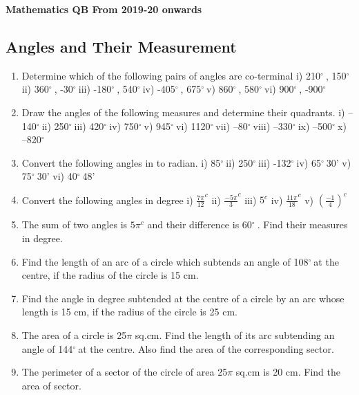 \documentclass[14pt]{article}
\newcommand{\degree}{$^{\circ}\ $} %
\begin{document}
\centering 
{\huge \bf Mathematics QB From 2019-20 onwards\par}
\vspace{1cm}
\begin{multicols}{2}
\section{Angles and Their Measurement}
\noindent
\begin{enumerate}
  
\item Determine which of the following pairs
of angles are co-terminal i) 210\degree, 150\degree
ii) 360\degree, -30\degree iii) -180\degree, 540\degree iv) -405\degree, 675\degree v) 860\degree, 580\degree vi) 900\degree, -900\degree 
\item Draw the angles of the following measures
and determine their quadrants. i) –140\degree  ii) 250\degree iii) 420\degree iv) 750\degree v) 945\degree vi) 1120\degree vii) –80\degree viii) –330\degree ix) –500\degree x) –820\degree

\item Convert the following angles in to radian. i) 85\degree ii) 250\degree iii) -132\degree iv) 65\degree30' v) 75\degree30' vi) 40\degree48'

\item Convert the following angles in degree 
i) $ \frac{7\pi}{12} ^c $
ii) $ \frac{-5\pi}{3} ^c $
iii) $ 5^c $
iv) $ \frac{11\pi}{18} ^c $
v) $ \left( \frac{-1}{4}\right)^c $

\item The sum of two angles is $5\pi^c$ and their
difference is 60\degree. Find their measures in
degree.

\item Find the length of an arc of a circle
which subtends an angle of 108\degree at the
centre, if the radius of the circle is 15
cm.

\item Find the angle in degree subtended at
the centre of a circle by an arc whose
length is 15 cm, if the radius of the
circle is 25 cm.

\item The area of a circle is 25$\pi$ sq.cm. Find
the length of its arc subtending an angle
of 144\degree at the centre. Also find the area
of the corresponding sector.

\item The perimeter of a sector of the circle
of area 25$\pi$ sq.cm is 20 cm. Find the
area of sector.


\end{enumerate}
\end{multicols}
\end{document}
